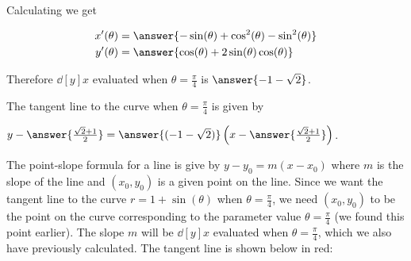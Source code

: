 \documentclass{ximera}
\begin{document}
\begin{exercise}
\begin{exercise}
\begin{hint}
Calculating we get

\begin{align*}
x'(\theta)&=\answer{ -\sin(\theta)+\cos^2(\theta)-\sin^2(\theta)} \\
y'(\theta)&=\answer{ \cos(\theta)+2\sin(\theta)\cos(\theta) }
\end{align*} 

Therefore $\dd[y]{x}$ evaluated when $\theta=\frac{\pi}{4}$ is $\answer{ -1-\sqrt{2}   }$.


\end{hint}

\begin{exercise}

The tangent line to the curve when $\theta=\frac{\pi}{4}$ is given by 

$y-\answer{\frac{\sqrt{2}+1}{2}   }=\answer{ ( -1-\sqrt{2} )  }\left( x- \answer{  \frac{\sqrt{2}+1}{2} }  \right)$. 

\begin{hint}


The point-slope formula for a line is give by $y-y_{0}=m(x-x_{0})$ where $m$ is the slope of the line and $(x_{0},y_{0})$ is a given point on the line. 
Since we want the tangent line to the curve $r=1+\sin(\theta)$ when $\theta=\frac{\pi}{4}$, we need $(x_{0},y_{0})$ to be the point on the curve corresponding to the parameter value $\theta=\frac{\pi}{4}$ (we found this point earlier). The slope $m$ will be $\dd[y]{x}$ evaluated when $\theta=\frac{\pi}{4}$, which we also have previously calculated. 
The tangent line is shown below in red:

\begin{image}  
\end{image} 


\end{hint}

\end{exercise}
\end{exercise}
\end{exercise}
\end{document}
